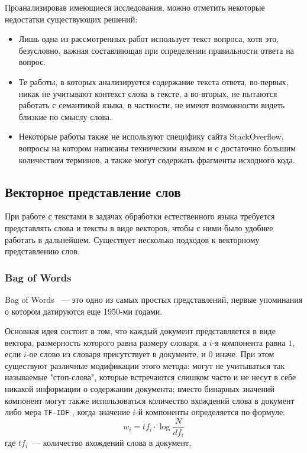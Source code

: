\documentclass[../diploma.tex]{subfiles}
\begin{document}
	Проанализировав имеющиеся исследования, можно отметить некоторые недостатки существующих решений:

	\begin{itemize}

		\item
		Лишь одна из рассмотренных работ использует текст вопроса, хотя это, безусловно, важная составляющая при определении правильности ответа на вопрос.

		\item
		Те работы, в которых анализируется содержание текста ответа, во-первых, никак не учитывают контекст слова в тексте, а во-вторых, 
		не пытаются работать с семантикой языка, в частности, не имеют возможности видеть близкие по смыслу слова.

		\item
		Некоторые работы также не используют специфику сайта StackOverflow, вопросы на котором написаны техническим языком и с достаточно большим количеством терминов, 
		а также могут содержать фрагменты исходного кода.

	\end{itemize}


    \subsection{Векторное представление слов}

	\label{subsec:word_embedding}

    При работе с текстами в задачах обработки естественного языка требуется представлять слова и тексты в виде векторов, чтобы с ними было удобнее работать в дальнейшем. 
    Существует несколько подходов к векторному представлению слов.

    
    \subsubsection{Bag of Words} 
    	
   	Bag of Words \cite{article:bag_of_words}~--- это одно из самых простых представлений, первые упоминания о котором датируются еще 1950-ми годами.

   	Основная идея состоит в том, что каждый документ представляется в виде вектора, размерность которого равна размеру словаря, 
   	а $i$-я компонента равна $1$, если $i$-ое слово из словаря присутствует в документе, и $0$ иначе.
   	При этом существуют различные модификации этого метода: могут не учитываться так называемые "стоп-слова", 
   	которые встречаются слишком часто и не несут в себе никакой информации о содержании документа;
   	вместо бинарных значений компонент могут также использоваться количество вхождений слова в документ либо мера \texttt{TF-IDF} \cite{article:tf_idf}, 
   	когда значение $i$-й компоненты определяется по формуле: 
   	\begin{equation} 
   		\label{eq:tf-idf}
   		w_i = tf_i \cdot \log \frac{N}{df_i}
   	\end{equation}
   	где 
   	$tf_i$~--- количество вхождений слова в документ,
   	 
\end{document}
